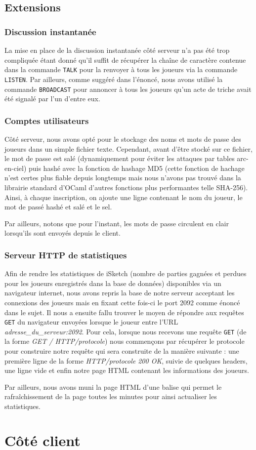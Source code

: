 \documentclass[a4paper, 11pt]{article}
\begin{document}
\subsection {Extensions}

\subsubsection{Discussion instantanée}

La mise en place de la discussion instantanée côté serveur n’a pas
été trop compliquée étant donné qu’il suffit de récupérer la chaîne de
caractère contenue dans la commande \verb+TALK+ pour la renvoyer à
tous les joueurs via la commande \verb+LISTEN+. Par ailleurs, comme
suggéré dans l’énoncé, nous avons utilisé la commande
\verb+BROADCAST+ pour annoncer à tous les joueurs qu’un acte de triche
avait été signalé par l’un d’entre eux.

\subsubsection {Comptes utilisateurs}

Côté serveur, nous avons opté pour le stockage des noms et mots de
passe des joueurs dans un simple fichier texte. Cependant, avant
d'être stocké sur ce fichier, le mot de passe est salé (dynamiquement
pour éviter les attaques par tables arc-en-ciel) puis hashé avec la
fonction de hashage MD5 (cette fonction de hachage n'est certes plus
fiable depuis longtemps mais nous n’avons pas trouvé dans la librairie
standard d'OCaml d’autres fonctions plus performantes telle SHA-256).
Ainsi, à chaque inscription, on ajoute une ligne contenant le nom du
joueur, le mot de passé hashé et salé et le sel.

\bigskip Par ailleurs, notons que pour l’instant, les mots de passe
circulent en clair lorsqu’ils sont envoyés depuis le client.

\subsubsection {Serveur HTTP de statistiques}

Afin de rendre les statistiques de iSketch (nombre de parties gagnées
et perdues pour les joueurs enregistrés dans la base de données)
disponibles via un navigateur internet, nous avons repris la base de
notre serveur acceptant les connexions des joueurs mais en fixant
cette fois-ci le port 2092 comme énoncé dans le sujet. Il nous a
ensuite fallu trouver le moyen de répondre aux requêtes \verb+GET+ du
navigateur envoyées lorsque le joueur entre l’URL
\textit{adresse\_du\_serveur:2092}. Pour cela, lorsque nous recevons
une requête \verb+GET+ (de la forme \textit{GET / HTTP/protocole})
nous commençons par récupérer le protocole pour construire notre
requête qui sera construite de la manière suivante : une première
ligne de la forme \textit{HTTP/protocole 200 OK}, suivie de quelques
headers, une ligne vide et enfin notre page HTML contenant les
informations des joueurs.

\bigskip Par ailleurs, nous avons muni la page HTML d’une balise qui
permet le rafraîchissement de la page toutes les minutes pour ainsi
actualiser les statistiques.

\section{Côté client}
\end{document}
